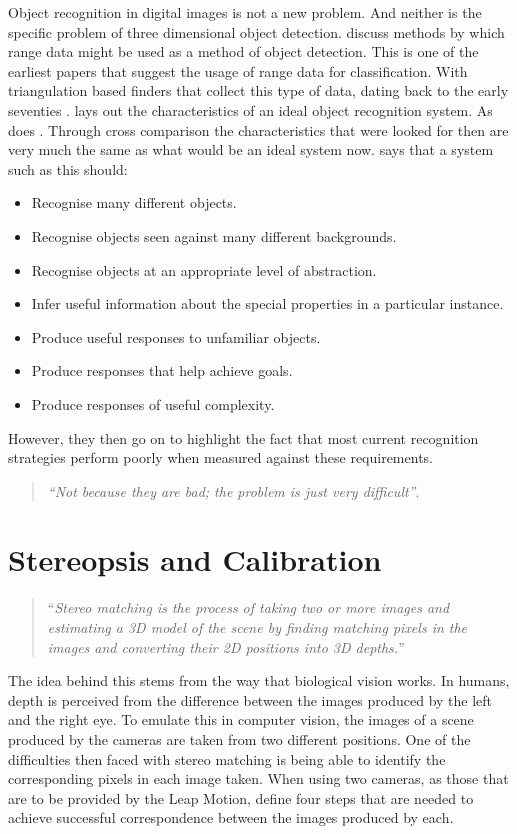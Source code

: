 \documentclass[11pt,oneside]{report}
\begin{document}
				Object recognition in digital images is not a new problem.
				And neither is the specific problem of three dimensional object detection.
				 discuss methods by which range data might be used as a method of object detection.
				This is one of the earliest papers that suggest the usage of range data for classification.
				With triangulation based finders that collect this type of data, dating back to the early seventies \cite{journal:range}.
				 lays out the characteristics of an ideal object recognition system.
				As does .
				Through cross comparison the characteristics that were looked for then are very much the same as what would be an ideal system now.
				 says that a system such as this should:
				\begin{itemize}
					\item Recognise many different objects.
					\item Recognise objects seen against many different backgrounds.
					\item Recognise objects at an appropriate level of abstraction.
					\item Infer useful information about the special properties in a particular instance.
					\item Produce useful responses to unfamiliar objects.
					\item Produce responses that help achieve goals.
					\item Produce responses of useful complexity.
				\end{itemize}
				However, they then go on to highlight the fact that most current recognition strategies perform poorly when measured against these requirements.
				\begin{quotation}
					\textit{``Not because they are bad; the problem is just very difficult''}.
				\end{quotation}
			\section{Stereopsis and Calibration}
			\begin{quote}
				``\textit{Stereo matching is the process of taking two or more images and estimating a 3D model of the scene by finding matching pixels in the images and converting their 2D positions into 3D depths.}''\cite{book:sam}
			\end{quote}
			The idea behind this stems from the way that biological vision works.
			In humans, depth is perceived from the difference between the images produced by the left and the right eye.
			To emulate this in computer vision, the images of a scene produced by the cameras are taken from two different positions.
			One of the difficulties then faced with stereo matching is being able to identify the corresponding pixels in each image taken.
			When using two cameras, as those that are to be provided by the Leap Motion,  define four steps that are needed to achieve successful correspondence between the images produced by each.
			
\end{document}
